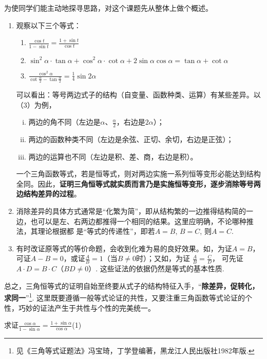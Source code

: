 为使同学们能主动地探寻思路，对这个课题先从整体上做个概述。
\begin{enumerate}
\item 观察以下三个等式：
\begin{enumerate}[(1)]
    \item $\frac{\cos t}{1-\sin t}=\frac{1+\sin t}{\cos t}$
    \item $\sin^2\alpha \cdot \tan\alpha +\cos^2\alpha\cdot \cot\alpha+2\sin\alpha\cos\alpha=\tan\alpha+\cot\alpha$
    \item $\frac{\cos^2\alpha}{\cot\frac{\alpha}{2}-\tan\frac{\alpha}{2}}=\frac{1}{4}\sin2\alpha$
\end{enumerate}
可以看出：等号两边式子的结构（自变量、函数种类、运算）有某些差异。以（3）为例，
\begin{enumerate}[(i)]
    \item 两边的角不同（左边是$\alpha$、$\frac{\alpha}{2}$，右边是$2\alpha$）；
    \item 两边的函数种类不同（左边是余弦、正切、余切，右边是正弦）；
    \item 两边的运算也不同（左边是积、差、商，右边是积）。
\end{enumerate}

一个三角函数等式，若是恒等式，则对两边实施一系列恒等变形必能达到结构全同。因此，\textbf{证明三角恒等式就实质而言乃是实施恒等变形，逐步消除等号两边结构差异的过程}。

\item 消除差异的具体方式通常是“化繁为简”，即从结构繁的一边推得结构简的一边，也可以是左、右两边都推得一个相同的结果。这里应明确，不论哪种推法，其理论根据都
是“等式的传递性”，即若$A=B$, $B=C$, 则$A=C$.

\item 有时改证原等式的等价命题，会收到化难为易的良好效果。如，为证$A=B$，可证$A-B=0$，或证$\frac{A}{B}=1$（当$B\ne 0$时）；又如，为证
$\frac{A}{B}=\frac{C}{D}$，
可先证$A\cdot D=B\cdot C$（$BD\ne 0$）. 这些证法的依据仍然是等式的基本性质.
\end{enumerate}

总之，三角恒等式的证明自始至终要从式子的结构特征入手，“\textbf{除差异，促转化，求同一}”\footnote{见《三角等式证题法》冯宝琦，丁学登编著，黑龙江人民出版社1982年版.}.
这里既要遵循一般等式论证的共性，又要注重三角函数等式论证的个性，巧妙的证法产生于共性与个性的完美统一。

\begin{example}
求证$\frac{\cos\alpha}{1-\sin\alpha}=\frac{1+\sin\alpha}{\cos\alpha}$\hfill(1)
\end{example}

